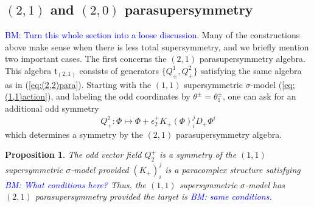 \documentclass[letterpaper,12pt]{article}
\newcommand{\RR}{\mathbb{R}}
\newcommand{\p}{\partial}
\newtheorem{proposition}[theorem]{Proposition}
\theoremstyle{definition}
\theoremstyle{remark}
\theoremstyle{examples}
\def\brian{\textcolor{blue}{BM: }\textcolor{blue}}
\begin{document}


%

\subsection{$(2,1)$ and $(2,0)$ parasupersymmetry}
\brian{Turn this whole section into a loose discussion.}
Many of the constructions above make sense when there is less total supersymmetry, and we briefly mention two important cases. The first concerns the $(2,1)$ parasupersymmetry algebra.
This algebra $\mathfrak{t}_{(2,1)}$ consists of generators $\{Q^1_\pm, Q^2_+\}$ satisfying the same algebra as in (\ref{eq:(2,2)para}). 
Starting with the $(1,1)$ supersymmetric $\sigma$-model (\ref{eq:(1,1)action}), and labeling the odd coordinates by $\theta^\pm = \theta_1^\pm$, one can ask for an additional odd symmetry 
\[
Q^2_+ :  \Phi \mapsto \Phi + \epsilon_2^+ K_+(\Phi)^j_i D_+ \Phi^i
\]
which determines a symmetry by the $(2,1)$ parasupersymmetry algebra.

\begin{proposition}
The odd vector field $Q_2^+$ is a symmetry of the $(1,1)$ supersymmetric $\sigma$-model provided $(K_+)^{j}_i$ is a paracomplex structure satisfying \brian{What conditions here?}
Thus, the $(1,1)$ supersymmetric $\sigma$-model has $(2,1)$ parasupersymmetry provided the target is \brian{same conditions}. 
\end{proposition}
\end{document}
